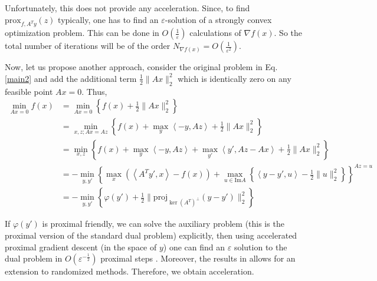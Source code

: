 \documentclass[final]{siamart1116}
\numberwithin{theorem}{section}
\begin{document}
	Unfortunately, this does not provide any acceleration. Since, to find $\text{prox}_{f,A^Ty}(z)$ typically, one has to find an $\varepsilon$-solution of a strongly convex optimization problem. This can be done in $O(\frac{1}{\varepsilon})$ calculations of $\nabla f(x)$. So the total number of iterations will be of the order $N_{\nabla f(x)} = O\left(  \frac{1}{\varepsilon^2}\right) $.
	
	Now, let us propose another approach, consider the original problem in Eq. \eqref{main2} and add the additional term $\frac{1}{2}\|Ax\|_2^2$ which is identically zero on any feasible point $Ax=0$. Thus,
	\begin{align*}
	\min_{Ax=0} f(x) & = \min_{Ax=0} \left\lbrace f(x) + \frac{1}{2}\|Ax\|_2^2\right\rbrace  \\
	& = \min_{x,z;Ax=Az} \left\lbrace  f(x) + \max_y \left\langle -y,Az \right\rangle + \frac{1}{2}\|Ax\|_2^2 \right\rbrace  \\
	& =\min_{x,z} \left\lbrace f(x) + \max_y \left\langle -y,Az \right\rangle +  \max_{y'} \left\langle y',Az-Ax \right\rangle + \frac{1}{2}\|Ax\|_2^2 \right\rbrace  \\
	& = - \min_{y,y'} \left\lbrace  \max_x  \left( \left\langle A^Ty',x \right\rangle -f(x)\right)  +\max_{u \in \text{Im}A} \left\lbrace  \left\langle y-y',u \right\rangle    - \frac{1}{2} \|u\|^2_2 \right\rbrace \right\rbrace  ^{Az=u}\\
	& = - \min_{y,y'} \left\lbrace \varphi(y') + \frac{1}{2}\| \text{proj}_{\ker(A^T)^{\perp} }(y - y')  \|_2^2\right\rbrace 
	\end{align*}
	
	If  $\varphi(y') $ is proximal friendly, we can solve the auxiliary problem (this is the proximal version of the standard dual problem) explicitly, then using accelerated proximal gradient descent (in the space of $y$) one can find an $\varepsilon$ solution to the dual problem in $  O\left( \varepsilon^{-\frac{1}{2}}\right) $ proximal steps \cite{par14}. Moreover, the results in \cite{lin15} allows for an extension to randomized methods. Therefore, we obtain acceleration. 
	
	
\end{document}
